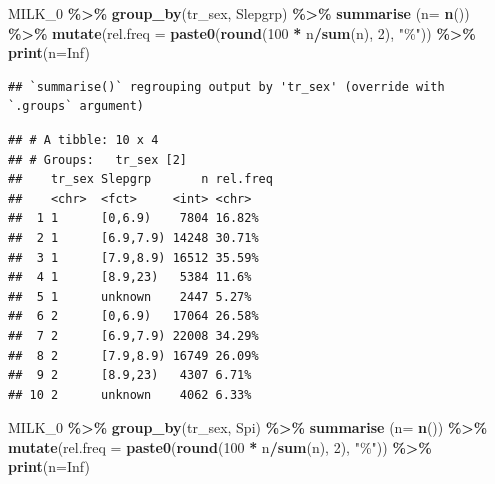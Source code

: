 \documentclass[
]{article}
\newenvironment{Shaded}{\begin{snugshade}}{\end{snugshade}}
\newcommand{\DataTypeTok}[1]{\textcolor[rgb]{0.13,0.29,0.53}{#1}}
\newcommand{\DecValTok}[1]{\textcolor[rgb]{0.00,0.00,0.81}{#1}}
\newcommand{\KeywordTok}[1]{\textcolor[rgb]{0.13,0.29,0.53}{\textbf{#1}}}
\newcommand{\NormalTok}[1]{#1}
\newcommand{\OperatorTok}[1]{\textcolor[rgb]{0.81,0.36,0.00}{\textbf{#1}}}
\newcommand{\OtherTok}[1]{\textcolor[rgb]{0.56,0.35,0.01}{#1}}
\newcommand{\StringTok}[1]{\textcolor[rgb]{0.31,0.60,0.02}{#1}}
\begin{document}
\begin{Shaded}
\begin{Highlighting}[]
\NormalTok{MILK\_}\DecValTok{0} \OperatorTok{\%\textgreater{}\%}\StringTok{ }
\StringTok{  }\KeywordTok{group\_by}\NormalTok{(tr\_sex, Slepgrp) }\OperatorTok{\%\textgreater{}\%}\StringTok{ }
\StringTok{  }\KeywordTok{summarise}\NormalTok{ (}\DataTypeTok{n=} \KeywordTok{n}\NormalTok{()) }\OperatorTok{\%\textgreater{}\%}
\StringTok{  }\KeywordTok{mutate}\NormalTok{(}\DataTypeTok{rel.freq =} \KeywordTok{paste0}\NormalTok{(}\KeywordTok{round}\NormalTok{(}\DecValTok{100} \OperatorTok{*}\StringTok{ }\NormalTok{n}\OperatorTok{/}\KeywordTok{sum}\NormalTok{(n), }\DecValTok{2}\NormalTok{), }\StringTok{"\%"}\NormalTok{))  }\OperatorTok{\%\textgreater{}\%}\StringTok{ }
\StringTok{  }\KeywordTok{print}\NormalTok{(}\DataTypeTok{n=}\OtherTok{Inf}\NormalTok{)}
\end{Highlighting}
\end{Shaded}

\begin{verbatim}
## `summarise()` regrouping output by 'tr_sex' (override with `.groups` argument)
\end{verbatim}

\begin{verbatim}
## # A tibble: 10 x 4
## # Groups:   tr_sex [2]
##    tr_sex Slepgrp       n rel.freq
##    <chr>  <fct>     <int> <chr>   
##  1 1      [0,6.9)    7804 16.82%  
##  2 1      [6.9,7.9) 14248 30.71%  
##  3 1      [7.9,8.9) 16512 35.59%  
##  4 1      [8.9,23)   5384 11.6%   
##  5 1      unknown    2447 5.27%   
##  6 2      [0,6.9)   17064 26.58%  
##  7 2      [6.9,7.9) 22008 34.29%  
##  8 2      [7.9,8.9) 16749 26.09%  
##  9 2      [8.9,23)   4307 6.71%   
## 10 2      unknown    4062 6.33%
\end{verbatim}

\begin{Shaded}
\begin{Highlighting}[]
\NormalTok{MILK\_}\DecValTok{0} \OperatorTok{\%\textgreater{}\%}\StringTok{ }
\StringTok{  }\KeywordTok{group\_by}\NormalTok{(tr\_sex, Spi) }\OperatorTok{\%\textgreater{}\%}\StringTok{ }
\StringTok{  }\KeywordTok{summarise}\NormalTok{ (}\DataTypeTok{n=} \KeywordTok{n}\NormalTok{()) }\OperatorTok{\%\textgreater{}\%}
\StringTok{  }\KeywordTok{mutate}\NormalTok{(}\DataTypeTok{rel.freq =} \KeywordTok{paste0}\NormalTok{(}\KeywordTok{round}\NormalTok{(}\DecValTok{100} \OperatorTok{*}\StringTok{ }\NormalTok{n}\OperatorTok{/}\KeywordTok{sum}\NormalTok{(n), }\DecValTok{2}\NormalTok{), }\StringTok{"\%"}\NormalTok{))  }\OperatorTok{\%\textgreater{}\%}\StringTok{ }
\StringTok{  }\KeywordTok{print}\NormalTok{(}\DataTypeTok{n=}\OtherTok{Inf}\NormalTok{)}
\end{Highlighting}
\end{Shaded}
\end{document}
